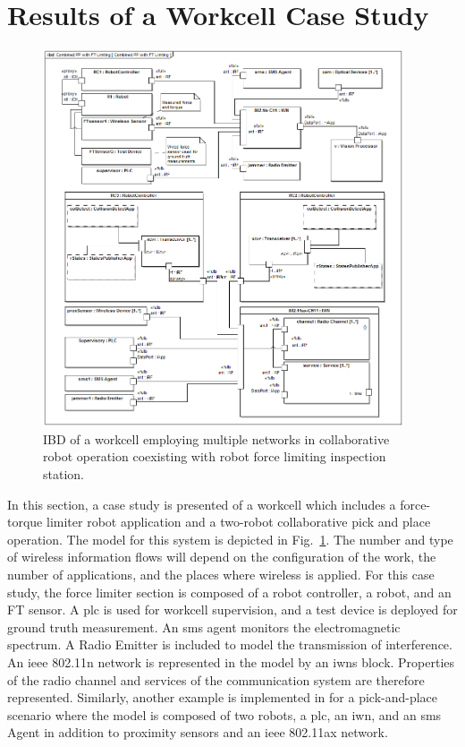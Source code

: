 \section{Results of a Workcell Case Study}\label{sysml:sec:wireless-infoflows}
\begin{figure}[tbp]
	\centering
	\includegraphics[width=0.95\textwidth]{./chapter-sysml/diagrams/ibd__Combined_PP_with_FT_Limiting__Combined_PP_with_FT_Limiting}
	\caption{IBD of a workcell employing multiple networks in collaborative robot operation coexisting with robot force limiting inspection station.}
	\label{sysml:fig:workcell:examples}     
\end{figure}

In this section, a case study is presented of a workcell which includes a force-torque limiter robot application and a two-robot collaborative pick and place operation.  The model for this system is depicted in Fig.~\ref{sysml:fig:workcell:examples}.  The number and type of wireless information flows will depend on the configuration of the work, the number of applications, and the places where wireless is applied. For this case study, the force limiter section is composed of a robot controller, a robot, and an FT sensor. A \gls{plc} is used for workcell supervision, and a test device is deployed for ground truth measurement.  An \gls{sms} agent monitors the electromagnetic spectrum.  A Radio Emitter is included to model the transmission of interference.  An \gls{ieee} 802.11n network is represented in the model by an \glspl{iwn} block. Properties of the radio channel and services of the communication system are therefore represented. Similarly, another example is implemented in \cite{Candell2018SysML.GitHub} for a pick-and-place scenario where the model is composed of two robots, a \gls{plc}, an \gls{iwn}, and an \gls{sms} Agent in addition to proximity sensors and an \gls{ieee} 802.11ax network.

